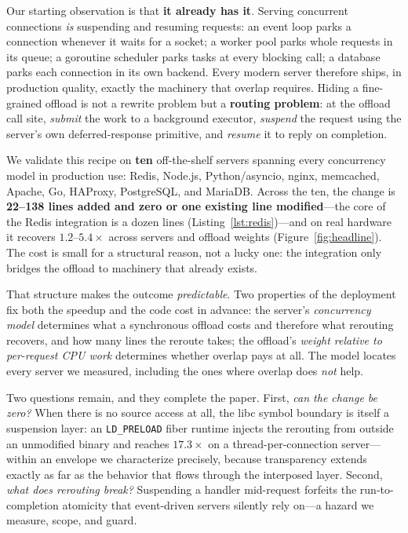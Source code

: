 Our starting observation is that \textbf{it already has it}. Serving concurrent connections
\emph{is} suspending and resuming requests: an event loop parks a connection whenever it waits for
a socket; a worker pool parks whole requests in its queue; a goroutine scheduler parks tasks at
every blocking call; a database parks each connection in its own backend. Every modern server
therefore ships, in production quality, exactly the machinery that overlap requires. Hiding a
fine-grained offload is not a rewrite problem but a \textbf{routing problem}: at the offload call
site, \emph{submit} the work to a background executor, \emph{suspend} the request using the
server's own deferred-response primitive, and \emph{resume} it to reply on completion.

We validate this recipe on \textbf{ten} off-the-shelf servers spanning every concurrency model in
production use: Redis, Node.js, Python/asyncio, nginx, memcached, Apache, Go, HAProxy, PostgreSQL,
and MariaDB. Across the ten, the change is \textbf{22--138 lines added and zero or one existing
line modified}---the core of the Redis integration is a dozen lines
(Listing~\ref{lst:redis})---and on real hardware it recovers $1.2$--$5.4\times$ across servers
and offload weights (Figure~\ref{fig:headline}). The cost is small for a structural reason, not a lucky one:
the integration only bridges the offload to machinery that already exists.

That structure makes the outcome \emph{predictable}. Two properties of the deployment fix both the
speedup and the code cost in advance: the server's \emph{concurrency model} determines what a
synchronous offload costs and therefore what rerouting recovers, and how many lines the reroute
takes; the offload's \emph{weight relative to per-request CPU work} determines whether overlap
pays at all. The model locates every server we measured, including the ones where overlap does
\emph{not} help.

Two questions remain, and they complete the paper. First, \emph{can the change be zero?} When
there is no source access at all, the libc symbol boundary is itself a suspension layer: an
\texttt{LD\_PRELOAD} fiber runtime injects the rerouting from outside an unmodified binary and
reaches $17.3\times$ on a thread-per-connection server---within an envelope we characterize
precisely, because transparency extends exactly as far as the behavior that flows through the
interposed layer. Second, \emph{what does rerouting break?} Suspending a handler mid-request
forfeits the run-to-completion atomicity that event-driven servers silently rely on---a hazard we
measure, scope, and guard.

